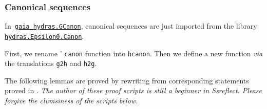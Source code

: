 





\subsubsection{Canonical sequences}


In~\href{../theories/html/gaia_hydras.GCanon.html}%
{\texttt{gaia\_hydras.GCanon}}, canonical sequences are just imported from the library \linebreak
\href{../theories/html/hydras.Epsilon0.Canon.html}%
{\texttt{hydras.Epsilon0.Canon}}.

First, we rename \HydrasLib' \texttt{canon} function into
\texttt{hcanon}. Then we define a new function \emph{via} the
translations \texttt{g2h} and \texttt{h2g}.


The following lemmas are proved by rewriting from corresponding statements proved in \HydrasLib.
\emph{The author of these proof scripts is still a beginner in Ssreflect. Please forgive the clumsiness of the scripts below.}









